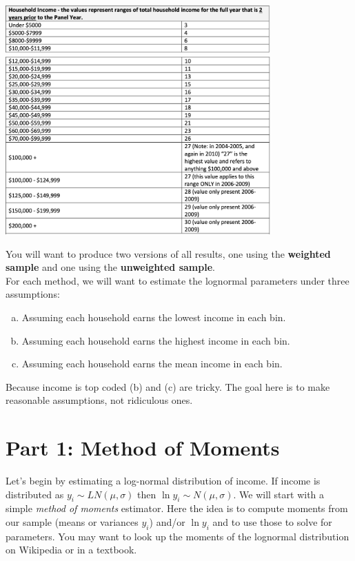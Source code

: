\documentclass{article}
\begin{document}
\begin{center}
\includegraphics[width=4in]{./income_1.png}\\
\includegraphics[width=4in]{./income_2.png}
\end{center}
\noindent You will want to produce two versions of all results, one using the \textbf{weighted sample} and one using the \textbf{unweighted sample}.\\

\noindent For each method, we will want to estimate the lognormal parameters under three assumptions:
\begin{enumerate}[(a)]
\item Assuming each household earns the lowest income in each bin.
\item Assuming each household earns the highest income in each bin.
\item Assuming each household earns the mean income in each bin.
\end{enumerate}
Because income is top coded (b) and (c) are tricky. The goal here is to make reasonable assumptions, not ridiculous ones.

\section*{\normalsize Part 1: Method of Moments}
Let's begin by estimating a log-normal distribution of income. If income is distributed as $y_i  \sim LN (\mu,\sigma)$ then $\ln y_i \sim N(\mu,\sigma)$. We will start with a simple \textit{method of moments} estimator. Here the idea is to compute moments from our sample (means or variances $y_i$) and/or $\ln y_i$ and to use those to solve for parameters. You may want to look up the moments of the lognormal distribution on Wikipedia or in a textbook.
\end{document}
